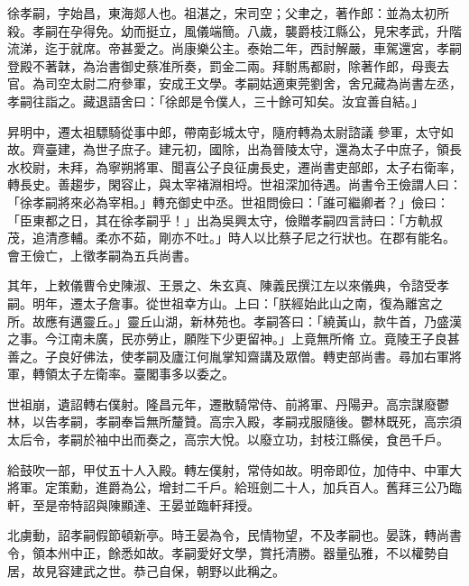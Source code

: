
\begin{pinyinscope}

 徐孝嗣，字始昌，東海郯人也。祖湛之，宋司空；父聿之，著作郎：並為太初所殺。孝嗣在孕得免。幼而挺立，風儀端簡。八歲，襲爵枝江縣公，見宋孝武，升階流涕，迄于就席。帝甚愛之。尚康樂公主。泰始二年，西討解嚴，車駕還宮，孝嗣登殿不著韎，為治書御史蔡准所奏，罰金二兩。拜駙馬都尉，除著作郎，母喪去官。為司空太尉二府參軍，安成王文學。孝嗣姑適東莞劉舍，舍兄藏為尚書左丞，孝嗣往詣之。藏退語舍曰：「徐郎是令僕人，三十餘可知矣。汝宜善自結。」



 昇明中，遷太祖驃騎從事中郎，帶南彭城太守，隨府轉為太尉諮議
 參軍，太守如故。齊臺建，為世子庶子。建元初，國除，出為晉陵太守，還為太子中庶子，領長水校尉，未拜，為寧朔將軍、聞喜公子良征虜長史，遷尚書吏部郎，太子右衛率，轉長史。善趨步，閑容止，與太宰褚淵相埒。世祖深加待遇。尚書令王儉謂人曰：「徐孝嗣將來必為宰相。」轉充御史中丞。世祖問儉曰：「誰可繼卿者？」儉曰：「臣東都之日，其在徐孝嗣乎！」出為吳興太守，儉贈孝嗣四言詩曰：「方軌叔茂，追清彥輔。柔亦不茹，剛亦不吐。」時人以比蔡子尼之行狀也。在郡有能名。會王儉亡，上徵孝嗣為五兵尚書。



 其年，上敕儀曹令史陳淑、王景之、朱玄真、陳義民撰江左以來儀典，令諮受孝嗣。明年，遷太子詹事。從世祖幸方山。上曰：「朕經始此山之南，復為離宮之所。故應有邁靈丘。」靈丘山湖，新林苑也。孝嗣答曰：「繞黃山，款牛首，乃盛漢之事。今江南未廣，民亦勞止，願陛下少更留神。」上竟無所脩
 立。竟陵王子良甚善之。子良好佛法，使孝嗣及廬江何胤掌知齋講及眾僧。轉吏部尚書。尋加右軍將軍，轉領太子左衛率。臺閣事多以委之。



 世祖崩，遺詔轉右僕射。隆昌元年，遷散騎常侍、前將軍、丹陽尹。高宗謀廢鬱林，以告孝嗣，孝嗣奉旨無所釐贊。高宗入殿，孝嗣戎服隨後。鬱林既死，高宗須太后令，孝嗣於袖中出而奏之，高宗大悅。以廢立功，封枝江縣侯，食邑千戶。



 給鼓吹一部，甲仗五十人入殿。轉左僕射，常侍如故。明帝即位，加侍中、中軍大將軍。定策勳，進爵為公，增封二千戶。給班劍二十人，加兵百人。舊拜三公乃臨軒，至是帝特詔與陳顯達、王晏並臨軒拜授。



 北虜動，詔孝嗣假節頓新亭。時王晏為令，民情物望，不及孝嗣也。晏誅，轉尚書令，領本州中正，餘悉如故。孝嗣愛好文學，賞托清勝。器量弘雅，不以權勢自居，故見容建武之世。恭己自保，朝野以此稱之。




\end{pinyinscope}
